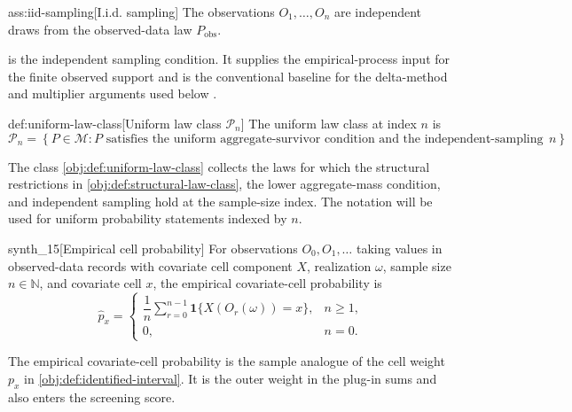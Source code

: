\documentclass[11pt]{article}
\begin{document}
\begin{assumptionv}{ass:iid-sampling}[I.i.d. sampling]
The observations \(O_1,\ldots,O_n\) are independent draws from the observed-data law \(P_{\mathrm{obs}}\).
\end{assumptionv}

 is the independent sampling condition.  It supplies the empirical-process input for the finite observed support and is the conventional baseline for the delta-method and multiplier arguments used below \citep{vanDerVaart1998}.

\begin{definitionv}{def:uniform-law-class}[Uniform law class \(\mathcal P_n\)]
The uniform law class at index \(n\) is
\[
\mathcal P_n
=
\left\{
P\in\mathcal M:
P \text{ satisfies the uniform aggregate-survivor condition and the independent-sampling condition at index } n
\right\}.
\]
\end{definitionv}

The class \cref{obj:def:uniform-law-class} collects the laws for which the structural restrictions in \cref{obj:def:structural-law-class}, the lower aggregate-mass condition, and independent sampling hold at the sample-size index.  The notation  will be used for uniform probability statements indexed by \(n\).

\begin{definitionv}{synth_15}[Empirical cell probability]
For observations \(O_0,O_1,\ldots\) taking values in observed-data records with covariate cell component \(X\), realization \(\omega\), sample size \(n\in\mathbb N\), and covariate cell \(x\), the empirical covariate-cell probability is
\[
\widehat p_x
=
\begin{cases}
\dfrac{1}{n}\sum_{r=0}^{n-1}\mathbf 1\{X(O_r(\omega))=x\}, & n\ge 1,\\
0, & n=0.
\end{cases}
\]
\end{definitionv}

The empirical covariate-cell probability  is the sample analogue of the cell weight \(p_x\) in \cref{obj:def:identified-interval}.  It is the outer weight in the plug-in sums and also enters the screening score.
\end{document}
